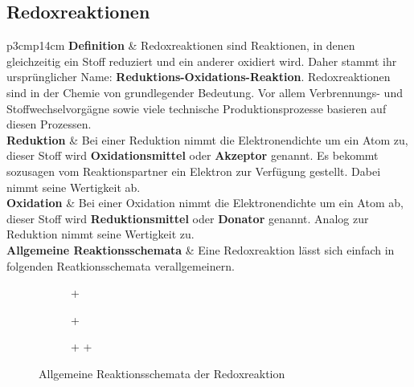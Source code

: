 \subsection{Redoxreaktionen}
\begin{longtable}{p{3cm}p{14cm}}
	\textbf{Definition}
		& Redoxreaktionen sind Reaktionen, in denen gleichzeitig ein Stoff reduziert und ein anderer oxidiert wird. Daher stammt ihr ursprünglicher Name: \textbf{Reduktions-Oxidations-Reaktion}. Redoxreaktionen sind in der Chemie von grundlegender Bedeutung. Vor allem Verbrennungs- und Stoffwechselvorgägne sowie viele technische Produktionsprozesse basieren auf diesen Prozessen.\\
	\hline
	\textbf{Reduktion}
		& Bei einer Reduktion nimmt die Elektronendichte um ein Atom zu, dieser Stoff wird \textbf{Oxidationsmittel} oder \textbf{Akzeptor} genannt. Es bekommt sozusagen vom Reaktionspartner ein Elektron zur Verfügung gestellt. Dabei nimmt seine Wertigkeit ab.\\
	\hline
	\textbf{Oxidation}
		& Bei einer Oxidation nimmt die Elektronendichte um ein Atom ab, dieser Stoff wird \textbf{Reduktionsmittel} oder \textbf{Donator} genannt. Analog zur Reduktion nimmt seine Wertigkeit zu.\\
	\textbf{Allgemeine Reaktionsschemata}
		& Eine Redoxreaktion lässt sich einfach in folgenden Reatkionsschemata verallgemeinern.
\end{longtable}
\begin{figure}[H]\centering
	\begin{subfigure}[H]{0.5\linewidth}\centering
		 \chemrel{->}  + 
	\end{subfigure}
	
	\begin{subfigure}[H]{0.5\linewidth}\centering
		 +  \chemrel{->}   
	\end{subfigure}
	
	\begin{subfigure}[H]{0.5\linewidth}\centering
		 +  \chemrel{->}  +  
	\end{subfigure}
	\caption{Allgemeine Reaktionsschemata der Redoxreaktion}
\end{figure}

